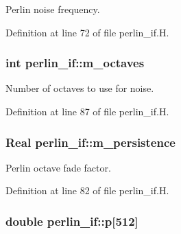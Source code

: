 Perlin noise frequency. 



Definition at line 72 of file perlin\+\_\+if.\+H.

\subsubsection[{\texorpdfstring{m\+\_\+octaves}{m_octaves}}]{\setlength{\rightskip}{0pt plus 5cm}int perlin\+\_\+if\+::m\+\_\+octaves\hspace{0.3cm}{\ttfamily [protected]}}\hypertarget{classperlin__if_a145abad7a7e328ac2443bc018a70c161}{}\label{classperlin__if_a145abad7a7e328ac2443bc018a70c161}


Number of octaves to use for noise. 



Definition at line 87 of file perlin\+\_\+if.\+H.

\subsubsection[{\texorpdfstring{m\+\_\+persistence}{m_persistence}}]{\setlength{\rightskip}{0pt plus 5cm}Real perlin\+\_\+if\+::m\+\_\+persistence\hspace{0.3cm}{\ttfamily [protected]}}\hypertarget{classperlin__if_af7f483571f4b422f2d738cfd22ef9939}{}\label{classperlin__if_af7f483571f4b422f2d738cfd22ef9939}


Perlin octave fade factor. 



Definition at line 82 of file perlin\+\_\+if.\+H.

\subsubsection[{\texorpdfstring{p}{p}}]{\setlength{\rightskip}{0pt plus 5cm}double perlin\+\_\+if\+::p\mbox{[}512\mbox{]}\hspace{0.3cm}{\ttfamily [protected]}}\hypertarget{classperlin__if_a4779b048464aa65904c54a5507dd873d}{}\label{classperlin__if_a4779b048464aa65904c54a5507dd873d}


